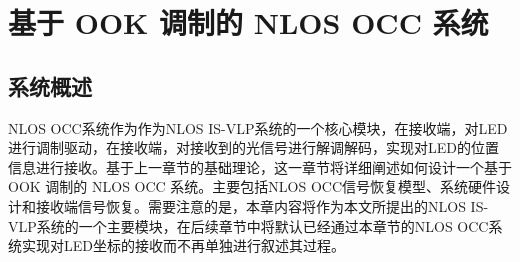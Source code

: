 \chapter{基于 OOK 调制的 NLOS OCC 系统}
\section{系统概述}
NLOS OCC系统作为作为NLOS IS-VLP系统的一个核心模块，在接收端，对LED进行调制驱动，在接收端，对接收到的光信号进行解调解码，实现对LED的位置信息进行接收。基于上一章节的基础理论，这一章节将详细阐述如何设计一个基于OOK 调制的 NLOS OCC 系统。主要包括NLOS OCC信号恢复模型、系统硬件设计和接收端信号恢复。需要注意的是，本章内容将作为本文所提出的NLOS IS-VLP系统的一个主要模块，在后续章节中将默认已经通过本章节的NLOS OCC系统实现对LED坐标的接收而不再单独进行叙述其过程。


